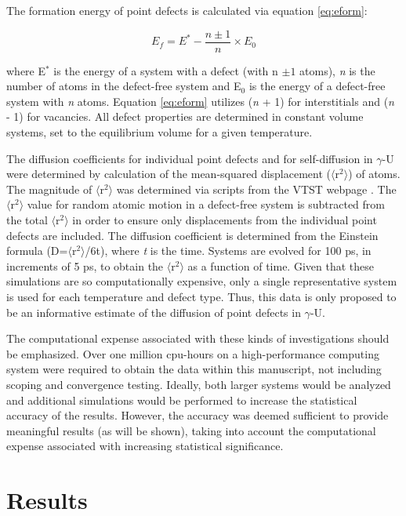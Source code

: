 \documentclass[review]{elsarticle}
\begin{document}
The formation energy of point defects is calculated via equation \ref{eq:eform}: 

\begin{equation}
\label{eq:eform}
E_f = E^* - \frac{n \pm 1}{n} \times E_0
\end{equation}

where E$^{*}$ is the energy of a system with a defect (with n $\pm 1$ atoms), \textit{n} is the number of atoms in the defect-free system and E$_{0}$ is the energy of a defect-free system with \textit{n} atoms. Equation \ref{eq:eform} utilizes (\textit{n} + 1) for interstitials and (\textit{n} - 1) for vacancies. All defect properties are determined in constant volume systems, set to the equilibrium volume for a given temperature. 

The diffusion coefficients for individual point defects and for self-diffusion in $\gamma$-U were determined by calculation of the mean-squared displacement ($\langle$r$^2$$\rangle$) of atoms. The magnitude of $\langle$r$^2$$\rangle$ was determined via scripts from the VTST webpage \cite{vtst}. The $\langle$r$^2$$\rangle$ value for random atomic motion in a defect-free system is subtracted from the total $\langle$r$^2$$\rangle$ in order to ensure only displacements from the individual point defects are included. The diffusion coefficient is determined from the Einstein formula (D=$\langle$r$^2$$\rangle$/6t), where \textit{t} is the time. Systems are evolved for 100 ps, in increments of 5 ps, to obtain the $\langle$r$^2$$\rangle$ as a function of time. Given that these simulations are so computationally expensive, only a single representative system is used for each temperature and defect type. Thus, this data is only proposed to be an informative estimate of the diffusion of point defects in $\gamma$-U. 

The computational expense associated with these kinds of investigations should be emphasized. Over one million cpu-hours on a high-performance computing system were required to obtain the data within this manuscript, not including scoping and convergence testing. Ideally, both larger systems would be analyzed and additional simulations would be performed to increase the statistical accuracy of the results. However, the accuracy was deemed sufficient to provide meaningful results (as will be shown), taking into account the computational expense associated with increasing statistical significance. 

\section{Results}
\end{document}
